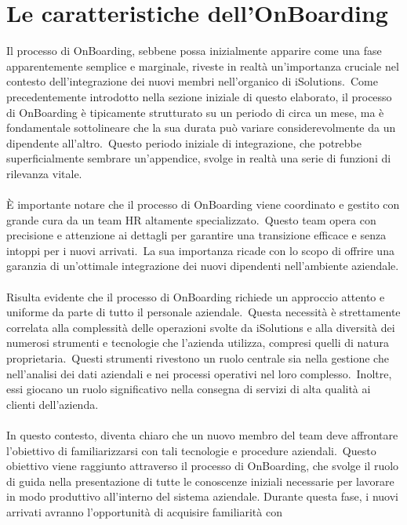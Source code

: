 \chapter{Le caratteristiche dell'OnBoarding}\label{chapter:caratteristiche_onboarding}
Il processo di OnBoarding, sebbene possa inizialmente apparire come una fase apparentemente semplice e marginale, 
riveste in realtà un'importanza cruciale nel contesto dell'integrazione dei nuovi membri nell'organico di iSolutions.\
Come precedentemente introdotto nella sezione iniziale di questo elaborato,
il processo di OnBoarding è tipicamente strutturato su un periodo di circa un mese, ma è fondamentale sottolineare che 
la sua durata può variare considerevolmente da un dipendente all'altro.\ Questo periodo iniziale di integrazione, 
che potrebbe superficialmente sembrare un'appendice, svolge in realtà una serie di funzioni di rilevanza vitale.
\\ \\
È importante notare che il processo di OnBoarding viene coordinato e gestito con grande cura da un team HR altamente specializzato.\ 
Questo team opera con precisione e attenzione ai dettagli per garantire una transizione efficace e senza intoppi per i nuovi arrivati.\ 
La sua importanza ricade con lo scopo di offrire una garanzia di un'ottimale integrazione dei nuovi dipendenti nell'ambiente aziendale.
\\ \\
Risulta evidente che il processo di OnBoarding richiede un approccio attento e uniforme da parte di tutto il personale aziendale.\ 
Questa necessità è strettamente correlata alla complessità delle operazioni svolte da iSolutions e alla diversità dei numerosi 
strumenti e tecnologie che l'azienda utilizza, compresi quelli di natura proprietaria.\ Questi strumenti rivestono un ruolo 
centrale sia nella gestione che nell'analisi dei dati aziendali e nei processi operativi nel loro complesso.\ 
Inoltre, essi giocano un ruolo significativo nella consegna di servizi di alta qualità ai clienti dell'azienda.
\\ \\
In questo contesto, diventa chiaro che un nuovo membro del team deve affrontare l'obiettivo di familiarizzarsi 
con tali tecnologie e procedure aziendali.\ Questo obiettivo viene raggiunto attraverso il processo di OnBoarding, 
che svolge il ruolo di guida nella presentazione di tutte le conoscenze iniziali necessarie per lavorare in modo produttivo 
all'interno del sistema aziendale. Durante questa fase, i nuovi arrivati avranno l'opportunità di acquisire familiarità con 
